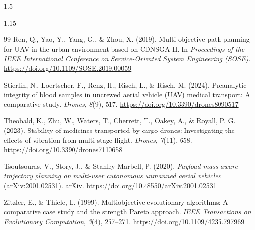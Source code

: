 \documentclass[a4paper, 14pt, oneside]{Thesis}
\begin{document}
\begin{spacing}{1.5}
\begin{spacing}{1.15}
\begin{thebibliography}{99}
Ren, Q., Yao, Y., Yang, G., \& Zhou, X. (2019). Multi-objective path planning for UAV in the urban environment based on CDNSGA-II. In \textit{Proceedings of the IEEE International Conference on Service-Oriented System Engineering (SOSE)}. \url{https://doi.org/10.1109/SOSE.2019.00059}

Stierlin, N., Loertscher, F., Renz, H., Risch, L., \& Risch, M. (2024). Preanalytic integrity of blood samples in uncrewed aerial vehicle (UAV) medical transport: A comparative study. \textit{Drones}, \textit{8}(9), 517. \url{https://doi.org/10.3390/drones8090517}

Theobald, K., Zhu, W., Waters, T., Cherrett, T., Oakey, A., \& Royall, P. G. (2023). Stability of medicines transported by cargo drones: Investigating the effects of vibration from multi-stage flight. \textit{Drones}, \textit{7}(11), 658. \url{https://doi.org/10.3390/drones7110658}

Tsoutsouras, V., Story, J., \& Stanley-Marbell, P. (2020). \textit{Payload-mass-aware trajectory planning on multi-user autonomous unmanned aerial vehicles} (arXiv:2001.02531). arXiv. \url{https://doi.org/10.48550/arXiv.2001.02531}

Zitzler, E., \& Thiele, L. (1999). Multiobjective evolutionary algorithms: A comparative case study and the strength Pareto approach. \textit{IEEE Transactions on Evolutionary Computation}, \textit{3}(4), 257--271. \url{https://doi.org/10.1109/4235.797969}

\end{thebibliography}
\end{spacing}



\end{spacing}
\end{document}
